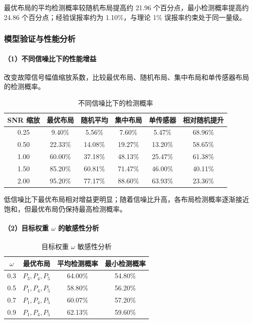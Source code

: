 \documentclass[UTF8,a4paper,12pt]{ctexart}
\numberwithin{figure}{section}
\numberwithin{table}{section}
\begin{document}
最优布局的平均检测概率较随机布局提高约 21.96 个百分点，最小检测概率提高约 24.86 个百分点；经验误报率约为 1.10\%，与理论 1\% 误报率约束处于同一量级。

\subsubsection{模型验证与性能分析}

\paragraph{（1）不同信噪比下的性能增益}

改变故障信号幅值缩放系数，比较最优布局、随机布局、集中布局和单传感器布局的检测概率。

\begin{table}[H]
\centering
\caption{不同信噪比下的检测概率}
\small
\begin{tabular}{cccccc}
\toprule
SNR 缩放 & 最优布局 & 随机平均 & 集中布局 & 单传感器 & 相对随机提升\\
\midrule
0.25 & 9.40\% & 5.56\% & 7.60\% & 5.47\% & 68.96\%\\
0.50 & 22.33\% & 14.08\% & 19.27\% & 13.20\% & 58.65\%\\
1.00 & 60.00\% & 37.18\% & 48.13\% & 25.47\% & 61.38\%\\
1.50 & 85.20\% & 60.81\% & 71.47\% & 46.00\% & 40.11\%\\
2.00 & 95.20\% & 77.17\% & 88.60\% & 63.93\% & 23.36\%\\
\bottomrule
\end{tabular}
\end{table}

低信噪比下最优布局相对增益更明显；随着信噪比升高，各布局检测概率逐渐接近饱和，但最优布局仍保持最高检测概率。

\paragraph{（2）目标权重 \(\omega\) 的敏感性分析}

\begin{table}[H]
\centering
\caption{目标权重 \(\omega\) 敏感性分析}
\begin{tabular}{cccc}
\toprule
\(\omega\) & 最优布局 & 平均检测概率 & 最小检测概率\\
\midrule
0.3 & \(P_3,P_4,P_5\) & 64.00\% & 54.80\%\\
0.5 & \(P_1,P_4,P_5\) & 58.80\% & 56.20\%\\
0.7 & \(P_1,P_4,P_5\) & 60.07\% & 57.20\%\\
0.9 & \(P_1,P_4,P_5\) & 62.13\% & 59.60\%\\
\bottomrule
\end{tabular}
\end{table}
\end{document}
